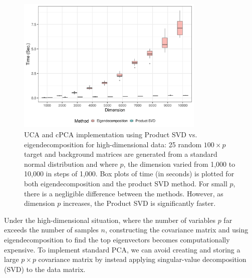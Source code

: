 \documentclass[12pt]{article}
\begin{document}
\begin{figure}[!ht]
  \centering
  \includegraphics[width = 0.8\textwidth]{figure/final_perf.png}
  \caption{UCA and cPCA implementation using Product SVD vs. eigendecomposition for high-dimensional data: 25 random $100 \times p $ target and background matrices are generated from a standard normal distribution and where $p$, the dimension varied from 1,000 to 10,000 in steps of 1,000. Box plots of time (in seconds) is plotted for both eigendecomposition and the product SVD method. For small $p$, there is a negligible difference between the methods. However, as dimension $p$ increases, the Product SVD is significantly faster.}
  \label{fig:computational_perf}
\end{figure}

Under the high-dimensional situation, where the number of variables $p$ far exceeds the number of samples $n$, constructing the covariance matrix and using eigendecomposition to find the top eigenvectors becomes computationally expensive. To implement standard PCA, we can avoid creating and storing a large $p \times p$ covariance matrix by instead applying singular-value decomposition (SVD) to the data matrix.
\end{document}

